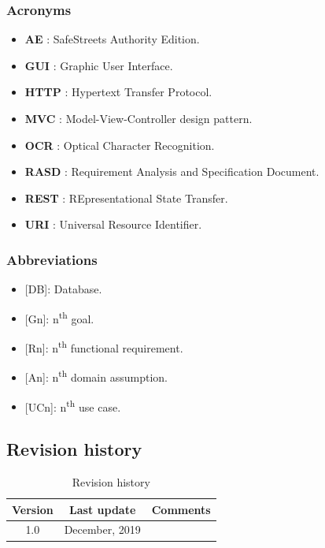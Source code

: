 \documentclass{article}
\begin{document}
		\subsubsection{Acronyms}
		\begin{itemize}
			\item \textbf{AE} \label{AE}: SafeStreets Authority Edition.
			\item \textbf{GUI} \label{GUI}: Graphic User Interface.
			\item \textbf{HTTP} \label{HTTP}: Hypertext Transfer Protocol.
			\item \textbf{MVC} \label{MVC}: Model-View-Controller design pattern.
			\item \textbf{OCR} \label{OCR}: Optical Character Recognition.
			\item \textbf{RASD} \label{RASD}: Requirement Analysis and Specification Document.
			\item \textbf{REST} \label{REST}: REpresentational State Transfer.
			\item \textbf{URI} \label{URI}: Universal Resource Identifier.

		\end{itemize}
		\subsubsection{Abbreviations}
		\begin{itemize}
			\item {[DB]}: Database.
			\item {[Gn]}: n\textsuperscript{th} goal.
			\item {[Rn]}: n\textsuperscript{th} functional requirement.
			\item {[An]}: n\textsuperscript{th} domain assumption.
			\item {[UCn]}: n\textsuperscript{th} use case.
		\end{itemize}
		\subsection{Revision history}
			\begin{table}[h]
				\centering
				\begin{tabular}{c c c}
					\hline
					\textbf{Version} & \textbf{Last update} & \textbf{Comments} \\ 
					\hline
					1.0 &  \nth{9} December, 2019  & \\
					\hline
				\end{tabular}
				\caption{Revision history}
				\label{fig:Revision history}
			\end{table}
\end{document}
